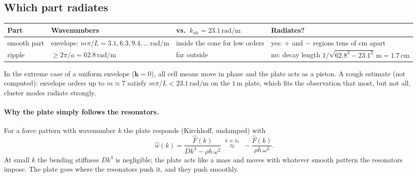 \subsection{Which part radiates}
\begin{center}
\begin{tabular}{|l|p{}|p{}|p{}|}
\hline
Part & Wavenumbers & vs.\ $k_\mathrm{air} = 23.1\,\mathrm{rad/m}$ & Radiates? \\
\hline
smooth part & envelope: $m\pi/L = 3.1, 6.3, 9.4, \dots\,\mathrm{rad/m}$ & inside the cone for low orders & yes: $+$ and $-$ regions tens of cm apart \\
ripple & $\ge 2\pi/a = 62.8\,\mathrm{rad/m}$ & far outside & no: decay length $1/\sqrt{62.8^2 - 23.1^2}\,\mathrm{m} = 1.7\,\mathrm{cm}$ \\
\hline
\end{tabular}
\end{center}
In the extreme case of a uniform envelope ($\mathbf{k} = 0$), all cell means move in
phase and the plate acts as a piston. A rough estimate (not computed): envelope
orders up to $m \approx 7$ satisfy $m\pi/L < 23.1\,\mathrm{rad/m}$ on the
$1\,\mathrm{m}$ plate, which fits the observation that most, but not all, cluster
modes radiate strongly.

\paragraph{Why the plate simply follows the resonators.}
For a force pattern with wavenumber $k$ the plate responds (Kirchhoff, undamped) with
\begin{equation}
  \hat w(k) = \frac{\hat F(k)}{D k^4 - \rho h\,\omega^2}
  \;\overset{k \ll k_b}{\approx}\; -\frac{\hat F(k)}{\rho h\,\omega^2} .
\end{equation}
At small $k$ the bending stiffness $D k^4$ is negligible; the plate acts like a mass
and moves with whatever smooth pattern the resonators impose. The plate goes where
the resonators push it, and they push smoothly.

